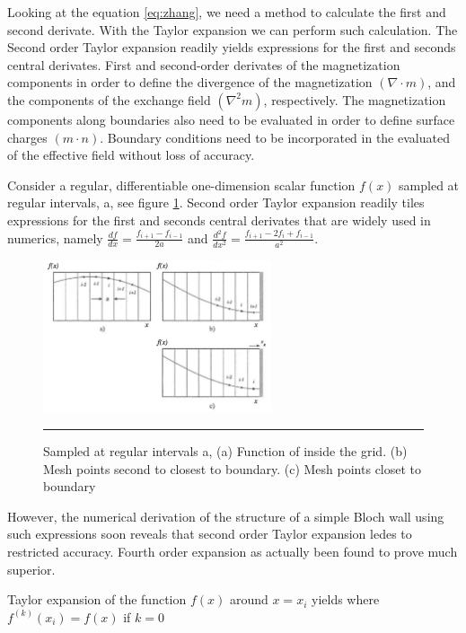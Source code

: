 Looking at the equation \ref{eq:zhang}, we need a method to calculate the first and second derivate. With the Taylor expansion we can perform such calculation. The Second order Taylor expansion readily yields expressions for the first and seconds central derivates. First and second-order derivates of the magnetization components in order to define the divergence  of the magnetization $(\nabla \cdot m)$, and the components of the exchange field $(\nabla^2m)$, respectively. The magnetization components along boundaries also need to be evaluated in order to define surface charges $(m \cdot n)$. Boundary conditions need to be incorporated in the evaluated of the effective field without loss of accuracy. 

Consider a regular, differentiable one-dimension  scalar function $f(x)$ sampled at regular intervals, a, see figure  \ref{fig:bound}. Second order Taylor expansion readily tiles expressions for the first and seconds central derivates that are widely used in numerics, namely $\frac{df}{dx} = \frac{f_{i+1} - f_{i-1}}{2a}$ and $\frac{d^2f}{dx^2} = \frac{f_{i+1} - 2f_i + f_{i-1}}{a^2}$.

\begin{figure}[htbp]
	\centering
		\includegraphics[width=0.6\textwidth]{Figures/bound.png}
		\rule{35em}{0.2pt}
	\caption[Sampled at regular intervals a, Taylor expansion]{Sampled at regular intervals a, (a) Function of inside the grid. (b) Mesh points second to closest to boundary. (c) Mesh points closet to boundary}
	\label{fig:bound}
\end{figure}

However, the numerical derivation of the structure of a simple Bloch wall using such expressions soon reveals that second order Taylor expansion ledes to restricted accuracy. Fourth order expansion as actually been found to prove much superior.  \cite{methods}

Taylor expansion of the function $f(x)$ around $x=x_i$ yields where $f^{(k)}(x_i) = f(x)$ if $k=0$

